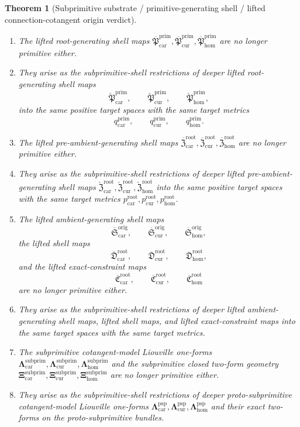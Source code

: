 \documentclass[11pt]{article}
\newcommand{\Car}{\mathrm{car}}
\newcommand{\Cur}{\mathrm{cur}}
\newcommand{\Hom}{\mathrm{hom}}
\newcommand{\RootTargetMetric}[1]{p_{#1}^{\mathrm{root}}}
\newcommand{\PrimTargetMetric}[1]{q_{#1}^{\mathrm{prim}}}
\newcommand{\SubprimLiftedRoot}[1]{\overline{\mathfrak P}_{#1}^{\mathrm{prim}}}
\newcommand{\SubprimLiftedPreAmbient}[1]{\overline{\mathfrak Z}_{#1}^{\mathrm{root}}}
\newcommand{\SubprimLiftedAmbient}[1]{\overline{\mathfrak S}_{#1}^{\mathrm{orig}}}
\newcommand{\SubprimLiftedShell}[1]{\overline{\mathfrak D}_{#1}^{\mathrm{root}}}
\newcommand{\SubprimConstraintMap}[1]{\overline{\mathfrak C}_{#1}^{\mathrm{root}}}
\newcommand{\SubprimLiouville}[1]{\boldsymbol{\Lambda}_{#1}^{\mathrm{subprim}}}
\newcommand{\SubprimTwo}[1]{\boldsymbol{\Xi}_{#1}^{\mathrm{subprim}}}
\newcommand{\ProtoSubprimLiftedRoot}[1]{\check{\mathfrak P}_{#1}^{\mathrm{prim}}}
\newcommand{\ProtoSubprimLiftedPreAmbient}[1]{\check{\mathfrak Z}_{#1}^{\mathrm{root}}}
\newcommand{\ProtoSubprimLiouville}[1]{\boldsymbol{\Lambda}_{#1}^{\mathrm{psp}}}
\newtheorem{theorem}{Theorem}
\begin{document}
\begin{theorem}[Subprimitive substrate / primitive-generating shell / lifted connection-cotangent origin verdict]
\begin{enumerate}
    \item The lifted root-generating shell maps \(\SubprimLiftedRoot{\Car},\SubprimLiftedRoot{\Cur},\SubprimLiftedRoot{\Hom}\) are no longer primitive either.
    \item They arise as the subprimitive-shell restrictions of deeper lifted root-generating shell maps
    \[
    \ProtoSubprimLiftedRoot{\Car},\qquad
    \ProtoSubprimLiftedRoot{\Cur},\qquad
    \ProtoSubprimLiftedRoot{\Hom},
    \]
    into the same positive target spaces with the same target metrics
    \[
    \PrimTargetMetric{\Car},\qquad
    \PrimTargetMetric{\Cur},\qquad
    \PrimTargetMetric{\Hom}.
    \]
    \item The lifted pre-ambient-generating shell maps \(\SubprimLiftedPreAmbient{\Car},\SubprimLiftedPreAmbient{\Cur},\SubprimLiftedPreAmbient{\Hom}\) are no longer primitive either.
    \item They arise as the subprimitive-shell restrictions of deeper lifted pre-ambient-generating shell maps \(\ProtoSubprimLiftedPreAmbient{\Car},\ProtoSubprimLiftedPreAmbient{\Cur},\ProtoSubprimLiftedPreAmbient{\Hom}\) into the same positive target spaces with the same target metrics \(\RootTargetMetric{\Car},\RootTargetMetric{\Cur},\RootTargetMetric{\Hom}\).
    \item The lifted ambient-generating shell maps
    \[
    \SubprimLiftedAmbient{\Car},\qquad
    \SubprimLiftedAmbient{\Cur},\qquad
    \SubprimLiftedAmbient{\Hom},
    \]
    the lifted shell maps
    \[
    \SubprimLiftedShell{\Car},\qquad
    \SubprimLiftedShell{\Cur},\qquad
    \SubprimLiftedShell{\Hom},
    \]
    and the lifted exact-constraint maps
    \[
    \SubprimConstraintMap{\Car},\qquad
    \SubprimConstraintMap{\Cur},\qquad
    \SubprimConstraintMap{\Hom}
    \]
    are no longer primitive either.
    \item They arise as the subprimitive-shell restrictions of deeper lifted ambient-generating shell maps, lifted shell maps, and lifted exact-constraint maps into the same target spaces with the same target metrics.
    \item The subprimitive cotangent-model Liouville one-forms \(\SubprimLiouville{\Car},\SubprimLiouville{\Cur},\SubprimLiouville{\Hom}\) and the subprimitive closed two-form geometry \(\SubprimTwo{\Car},\SubprimTwo{\Cur},\SubprimTwo{\Hom}\) are no longer primitive either.
    \item They arise as the subprimitive-shell restrictions of deeper proto-subprimitive cotangent-model Liouville one-forms \(\ProtoSubprimLiouville{\Car},\ProtoSubprimLiouville{\Cur},\ProtoSubprimLiouville{\Hom}\) and their exact two-forms on the proto-subprimitive bundles.

\end{enumerate}
\end{theorem}
\end{document}
